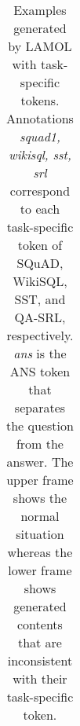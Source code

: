 \documentclass{article} \usepackage{iclr2020_conference,times}
\begin{document}
\begin{table}[h]
\begin{threeparttable}
\begin{adjustbox}{max width=\textwidth}
\begin{tabular}{|m{50em}|}
    \\
    \\
    \hline
    \end{tabular}
    \end{adjustbox}
    \caption{Examples generated by LAMOL with task-specific tokens. Annotations \textit{\textunderscore \textunderscore squad1\textunderscore \textunderscore, \textunderscore \textunderscore wikisql\textunderscore \textunderscore, \textunderscore \textunderscore sst\textunderscore \textunderscore, \textunderscore \textunderscore srl\textunderscore \textunderscore} correspond to each task-specific token of SQuAD, WikiSQL, SST, and QA-SRL, respectively. \textit{\textunderscore \textunderscore ans\textunderscore \textunderscore} is the ANS token that separates the question from the answer. The upper frame shows the normal situation whereas the lower frame shows generated contents that are inconsistent with their task-specific token.}
\label{tab:gen_ex}
\end{threeparttable}
\end{table}
 
\end{document}
